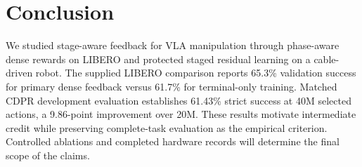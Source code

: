 \section{Conclusion}\label{sec:conclusion}
We studied stage-aware feedback for VLA manipulation through phase-aware dense rewards on LIBERO and protected staged residual learning on a cable-driven robot. The supplied LIBERO comparison reports 65.3\% validation success for primary dense feedback versus 61.7\% for terminal-only training. Matched CDPR development evaluation establishes 61.43\% strict success at 40M selected actions, a 9.86-point improvement over 20M. These results motivate intermediate credit while preserving complete-task evaluation as the empirical criterion.  Controlled ablations and completed hardware records will determine the final scope of the claims.
